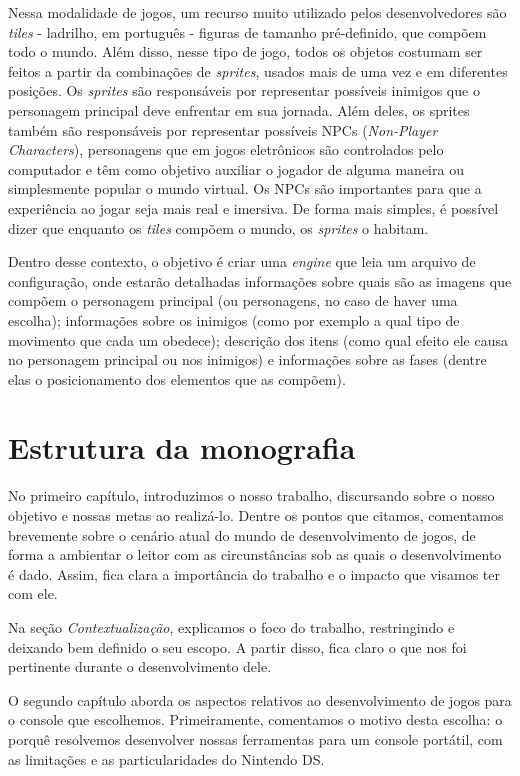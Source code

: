 \documentclass[brazil]{abnt}
\begin{document}
Nessa modalidade de jogos, um recurso muito utilizado pelos desenvolvedores são \textit{tiles} - ladrilho, em português - figuras de tamanho pré-definido, que compõem todo o mundo. Além disso, nesse tipo de jogo, todos os objetos costumam ser feitos a partir da combinações de \textit{sprites}, usados mais de uma vez e em diferentes posições. Os \textit{sprites} são responsáveis por representar possíveis inimigos que o personagem principal deve enfrentar em sua jornada. Além deles, os sprites também são responsáveis por representar possíveis NPCs (\textit{Non-Player Characters}), personagens que em jogos eletrônicos são controlados pelo computador e têm como objetivo auxiliar o jogador de alguma maneira ou simplesmente popular o mundo virtual. Os NPCs são importantes para que a experiência ao jogar seja mais real e imersiva. De forma mais simples, é possível dizer que enquanto os \textit{tiles} compõem o mundo, os \textit{sprites} o habitam.

Dentro desse contexto, o objetivo é criar uma \textit{engine} que leia um arquivo de configuração, onde estarão detalhadas informações sobre quais são as imagens que compõem o personagem principal (ou personagens, no caso de haver uma escolha); informações sobre os inimigos (como por exemplo a qual tipo de movimento que cada um obedece); descrição dos itens (como qual efeito ele causa no personagem principal ou nos inimigos) e informações sobre as fases (dentre elas o posicionamento dos elementos que as compõem).

\section{Estrutura da monografia}

No primeiro capítulo, introduzimos o nosso trabalho, discursando sobre o nosso objetivo e nossas metas ao realizá-lo. Dentre os pontos que citamos, comentamos brevemente sobre o cenário atual do mundo de desenvolvimento de jogos, de forma a ambientar o leitor com as circunstâncias sob as quais o desenvolvimento é dado. Assim, fica clara a importância do trabalho e o impacto que visamos ter com ele.

Na seção \textit{Contextualização}, explicamos o foco do trabalho, restringindo e deixando bem definido o seu escopo. A partir disso, fica claro o que nos foi pertinente durante o desenvolvimento dele.

O segundo capítulo aborda os aspectos relativos ao desenvolvimento de jogos para o console que escolhemos. Primeiramente, comentamos o motivo desta escolha: o porquê resolvemos desenvolver nossas ferramentas para um console portátil, com as limitações e as particularidades do Nintendo DS.
\end{document}
